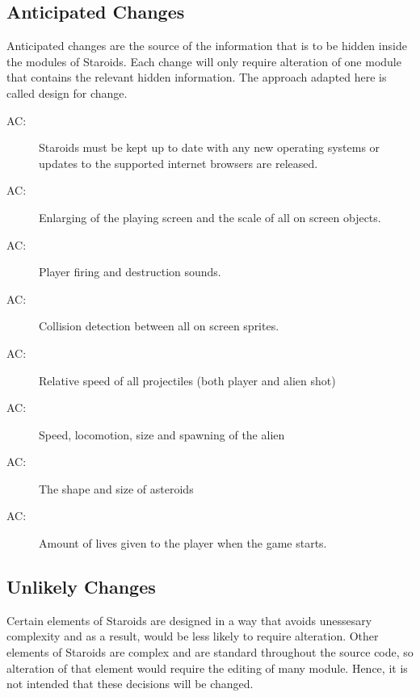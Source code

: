 \documentclass[12pt, titlepage]{article}
\newcounter{acnum}
\newcommand{\actheacnum}{AC\theacnum}
\begin{document}
\subsection{Anticipated Changes} \label{SecAchange}

Anticipated changes are the source of the information that is to be hidden inside the modules of Staroids. Each change will only require alteration of one module that contains the relevant hidden information. The approach adapted here is called design for change.

\begin{description}
\item[ \actheacnum \label{acHardware}:] Staroids must be kept up to date with any new operating systems or updates to the supported internet browsers are released.
\item[ \actheacnum \label{acUtilities}:] Enlarging of the playing screen and the scale of all on screen objects.
\item[ \actheacnum \label{acSound}:] Player firing and destruction sounds.
\item[ \actheacnum \label{acGameobject}:] Collision detection between all on screen sprites.
\item[ \actheacnum \label{acGameobject}:] Relative speed of all projectiles (both player and alien shot)
\item[ \actheacnum \label{acGameobject}:] Speed, locomotion, size and spawning of the alien
\item[ \actheacnum \label{acGameobject}:] The shape and size of asteroids
\item[ \actheacnum \label{acGamestate}:] Amount of lives given to the player when the game starts.
\end{description}

\subsection{Unlikely Changes} \label{SecUchange}

Certain elements of Staroids are designed in a way that avoids unessesary complexity and as a result, would be less likely to require alteration. Other elements of Staroids are complex and are standard throughout the source code, so alteration of that element would require the editing of many module. Hence, it is not intended that these decisions will be changed.
\end{document}
